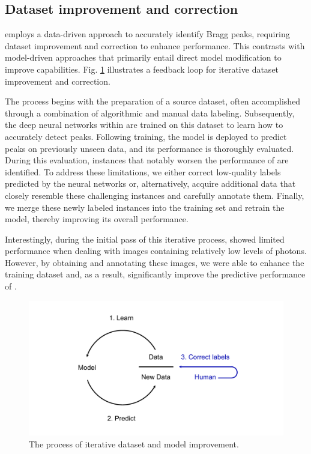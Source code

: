 \documentclass[a4paper]{article}
\begin{document}
\subsection{Dataset improvement and correction}

\peaknet{} employs a data-driven approach to accurately identify Bragg peaks,
requiring dataset improvement and correction to enhance performance.  This
contrasts with model-driven approaches that primarily entail direct model
modification to improve capabilities.  Fig. \ref{fig : data engine} illustrates
a feedback loop for iterative dataset improvement and correction.  

The process begins with the preparation of a source dataset, often accomplished
through a combination of algorithmic and manual data labeling.  Subsequently,
the deep neural networks within \peaknet{} are trained on this dataset to learn
how to accurately detect peaks.  Following training, the model is deployed to
predict peaks on previously unseen data, and its performance is thoroughly
evaluated.  During this evaluation, instances that notably worsen the
performance of \peaknet{} are identified.  To address these limitations, we
either correct low-quality labels predicted by the neural networks or,
alternatively, acquire additional data that closely resemble these challenging
instances and carefully annotate them.  Finally, we merge these newly labeled
instances into the training set and retrain the model, thereby improving its
overall performance.  

Interestingly, during the initial pass of this iterative process, \peaknet{}
showed limited performance when dealing with images containing relatively low
levels of photons.  However, by obtaining and annotating these images, we were
able to enhance the training dataset and, as a result, significantly improve the
predictive performance of \peaknet{}.


\begin{figure}[!ht]
\centering
\includegraphics[width=\columnwidth,keepaspectratio,trim={1in 0in 1in 0in}]
{./figures/data_engine.pdf}
\caption{The process of iterative dataset and model improvement.}
\label{fig : data engine}
\end{figure}
\end{document}
